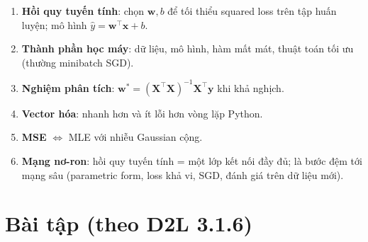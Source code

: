 \documentclass[12pt,a4paper]{article}
\begin{document}
\begin{tongket}[title={Chương 3.1 --- Những điểm cần nhớ}]
\begin{enumerate}
  \item \textbf{Hồi quy tuyến tính}: chọn $\mathbf{w}, b$ để tối thiểu squared loss trên tập huấn luyện; mô hình $\hat{y} = \mathbf{w}^\top\mathbf{x} + b$.
  \item \textbf{Thành phần học máy}: dữ liệu, mô hình, hàm mất mát, thuật toán tối ưu (thường minibatch SGD).
  \item \textbf{Nghiệm phân tích}: $\mathbf{w}^* = (\mathbf{X}^\top\mathbf{X})^{-1}\mathbf{X}^\top\mathbf{y}$ khi khả nghịch.
  \item \textbf{Vector hóa}: nhanh hơn và ít lỗi hơn vòng lặp Python.
  \item \textbf{MSE} $\Leftrightarrow$ MLE với nhiễu Gaussian cộng.
  \item \textbf{Mạng nơ-ron}: hồi quy tuyến tính = một lớp kết nối đầy đủ; là bước đệm tới mạng sâu (parametric form, loss khả vi, SGD, đánh giá trên dữ liệu mới).
\end{enumerate}
\end{tongket}

\newpage

\section{Bài tập (theo D2L 3.1.6)}
\end{document}
